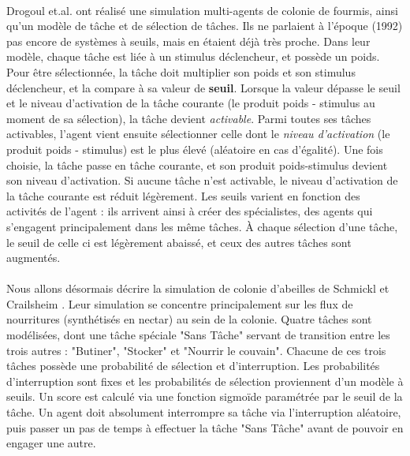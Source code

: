         \paragraph{}
        Drogoul et.al. \cite{drogoul_multi-agent_1992} ont réalisé une simulation multi-agents de colonie de fourmis, ainsi qu'un modèle de tâche et de sélection de tâches. Ils ne parlaient à l'époque (1992) pas encore de systèmes à seuils, mais en étaient déjà très proche. Dans leur modèle, chaque tâche est liée à un stimulus déclencheur, et possède un poids. Pour être sélectionnée, la tâche doit multiplier son poids et son stimulus déclencheur, et la compare à sa valeur de \textbf{seuil}. Lorsque la valeur dépasse le seuil et le niveau d'activation de la tâche courante (le produit poids - stimulus au moment de sa sélection), la tâche devient \textit{activable}. Parmi toutes ses tâches activables, l'agent vient ensuite sélectionner celle dont le \textit{niveau d'activation} (le produit poids - stimulus) est le plus élevé (aléatoire en cas d'égalité). Une fois choisie, la tâche passe en tâche courante, et son produit poids-stimulus devient son niveau d'activation. Si aucune tâche n'est activable, le niveau d'activation de la tâche courante est réduit légèrement. Les seuils varient en fonction des activités de l'agent : ils arrivent ainsi à créer des spécialistes, des agents qui s'engagent principalement dans les même tâches. À chaque sélection d'une tâche, le seuil de celle ci est légèrement abaissé, et ceux des autres tâches sont augmentés.
        
        \paragraph{}
        Nous allons désormais décrire la simulation de colonie d'abeilles de Schmickl et Crailsheim \cite{schmickl_analysing_2008}. Leur simulation se concentre principalement sur les flux de nourritures (synthétisés en nectar) au sein de la colonie. Quatre tâches sont modélisées, dont une tâche spéciale "Sans Tâche" servant de transition entre les trois autres : "Butiner", "Stocker" et "Nourrir le couvain". Chacune de ces trois tâches possède une probabilité de sélection et d'interruption. Les probabilités d'interruption sont fixes et les probabilités de sélection proviennent d'un modèle à seuils. Un score est calculé via une fonction sigmoïde paramétrée par le seuil de la tâche. Un agent doit absolument interrompre sa tâche via l'interruption aléatoire, puis passer un pas de temps à effectuer la tâche "Sans Tâche" avant de pouvoir en engager une autre. 
        
